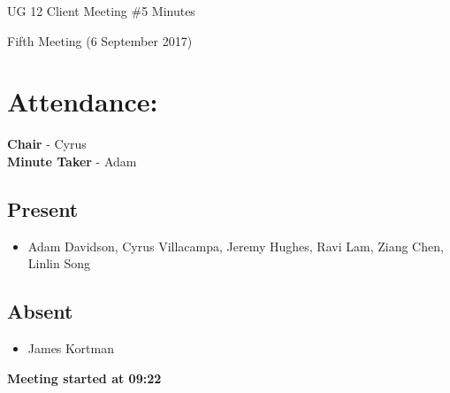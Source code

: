 \documentclass{article}
\begin{document}
\begin{adjustwidth}{2.5em}{0pt}
\begin{center}
\Large{UG 12 Client Meeting \#5  Minutes}\\
\end{center}
\end{adjustwidth}

Fifth Meeting (6 September 2017)
\section{Attendance:}
\textbf{Chair} - Cyrus\\
\textbf{Minute Taker} - Adam\\
\subsection*{Present}
\begin{itemize}
\item Adam Davidson, Cyrus Villacampa, Jeremy Hughes, Ravi Lam, Ziang Chen, Linlin Song
\end{itemize}
\subsection*{Absent}
\begin{itemize}
\item   James Kortman
\end {itemize}
\textbf{Meeting started at 09:22}
\end{document}
